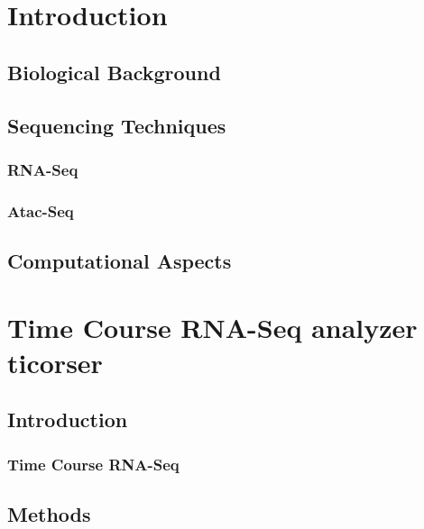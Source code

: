 \documentclass[b5paper,oneside,british,intoc,bibliograph=totoc,index=totoc,BCOR10mm,twoside,openright]{book}
\numberwithin{equation}{section}
\numberwithin{figure}{section}
\begin{document}

%
\newpage
\chapter{Introduction}


\section{Biological Background}


\section{Sequencing Techniques}
\subsection{RNA-Seq} \label{sec:rnaseq}

\subsection{Atac-Seq} \label{sec:atacseq}


\section{Computational Aspects}


\chapter{Time Course RNA-Seq analyzer \newline ticorser} \label{sec:ticorsecap}


\section{Introduction} \label{sec:ticorseintro}


\subsection{Time Course RNA-Seq} \label{sec:ticorsernaseq}

\section{Methods} \label{sec:ticorseintromethods}

\end{document}
